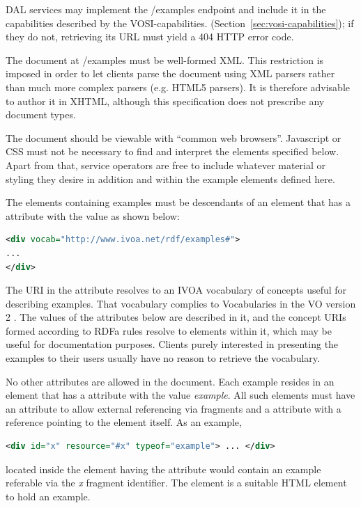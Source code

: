\documentclass[11pt,letter]{ivoa}
\begin{document}
DAL services may implement the /examples endpoint and include it in the
capabilities described by the VOSI-capabilities.
(Section~\ref{sec:vosi-capabilities}); if they
do not, retrieving its URL must yield a 404 HTTP error code.

The document at /examples must be well-formed XML. This restriction is imposed
in order to let clients parse the document using XML parsers rather than
much more complex parsers (e.g. HTML5 parsers). It is therefore advisable to
author it in XHTML, although this specification does not prescribe any document
types.

The document should be viewable with ``common web browsers''. Javascript or CSS
must not be necessary to find and interpret the elements specified below.  Apart
from that, service operators are free to include whatever material or styling
they desire in addition and within the example elements defined here.

The elements containing examples must be descendants of an element that has a
 attribute with the value as shown below:

\begin{lstlisting}[language=XML]
<div vocab="http://www.ivoa.net/rdf/examples#">
...
</div>
\end{lstlisting}

The URI in the  attribute resolves to an IVOA vocabulary of
concepts useful for describing examples.  That vocabulary complies to
Vocabularies in the VO version 2 \citep{2021ivoa.spec.0525D}.   The
values of the  attributes below are described in it, and
the concept URIs formed according to RDFa rules resolve to elements
within it, which may be useful for documentation purposes.  Clients
purely interested in presenting the examples to their users usually have
no reason to retrieve the vocabulary.

No other  attributes are allowed in the document. Each example resides in
an element that has a  attribute with the value
\emph{example}. All such elements
must have an  attribute to allow external referencing via fragments and a
 attribute with a reference pointing to the element itself. As an
example,

\begin{lstlisting}[language=XML]
<div id="x" resource="#x" typeof="example"> ... </div>
\end{lstlisting}

\noindent located inside the element having the  attribute would
contain an example referable via the \emph{x} fragment identifier. The
 element is
a suitable HTML element to hold an example.
\end{document}
